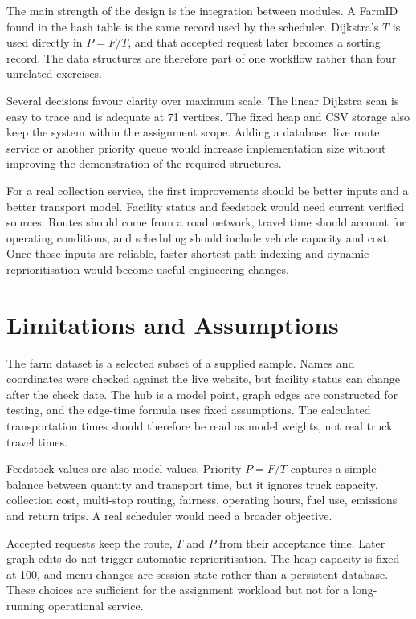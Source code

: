\documentclass[10pt,a4paper]{article}
\begin{document}
The main strength of the design is the integration between modules. A FarmID found in the hash table is the same record used by the scheduler. Dijkstra's $T$ is used directly in $P=F/T$, and that accepted request later becomes a sorting record. The data structures are therefore part of one workflow rather than four unrelated exercises.

Several decisions favour clarity over maximum scale. The linear Dijkstra scan is easy to trace and is adequate at 71 vertices. The fixed heap and CSV storage also keep the system within the assignment scope. Adding a database, live route service or another priority queue would increase implementation size without improving the demonstration of the required structures.

For a real collection service, the first improvements should be better inputs and a better transport model. Facility status and feedstock would need current verified sources. Routes should come from a road network, travel time should account for operating conditions, and scheduling should include vehicle capacity and cost. Once those inputs are reliable, faster shortest-path indexing and dynamic reprioritisation would become useful engineering changes.

\section{Limitations and Assumptions}
\label{sec:limitations}

The farm dataset is a selected subset of a supplied sample. Names and coordinates were checked against the live website, but facility status can change after the check date. The hub is a model point, graph edges are constructed for testing, and the edge-time formula uses fixed assumptions. The calculated transportation times should therefore be read as model weights, not real truck travel times.

Feedstock values are also model values. Priority $P=F/T$ captures a simple balance between quantity and transport time, but it ignores truck capacity, collection cost, multi-stop routing, fairness, operating hours, fuel use, emissions and return trips. A real scheduler would need a broader objective.

Accepted requests keep the route, $T$ and $P$ from their acceptance time. Later graph edits do not trigger automatic reprioritisation. The heap capacity is fixed at 100, and menu changes are session state rather than a persistent database. These choices are sufficient for the assignment workload but not for a long-running operational service.
\end{document}
